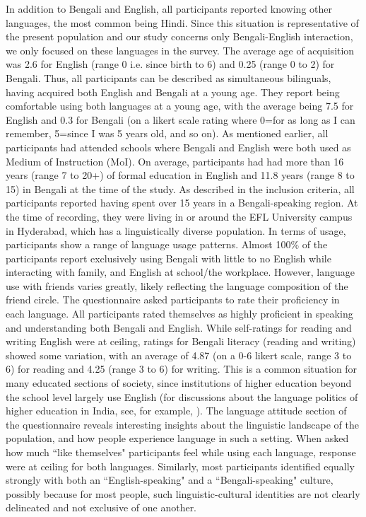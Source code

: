 \documentclass[12 pt]{article}
\begin{document}
In addition to Bengali and English, all participants reported knowing other languages, the most common being Hindi. Since this situation is representative of the present population and our study concerns only Bengali-English interaction, we only focused on these languages in the survey.
The average age of acquisition was 2.6 for English (range 0 i.e. since birth to 6) and 0.25 (range 0 to 2) for Bengali. Thus, all participants can be described as simultaneous bilinguals, having acquired both English and Bengali at a young age. They report being comfortable using both languages at a young age, with the average being 7.5 for English and 0.3 for Bengali (on a likert scale rating where 0=for as long as I can remember, 5=since I was 5 years old, and so on). As mentioned earlier, all participants had attended schools where Bengali and English were both used as Medium of Instruction (MoI). On average, participants had had more than 16 years (range 7 to 20+) of formal education in English and 11.8 years (range 8 to 15) in Bengali at the time of the study. As described in the inclusion criteria, all participants reported having spent over 15 years in a Bengali-speaking region. At the time of recording, they were living in or around the EFL University campus in Hyderabad, which has a linguistically diverse population. In terms of usage, participants show a range of language usage patterns. Almost 100\% of the participants report exclusively using Bengali with little to no English while interacting with family, and English at school/the workplace. However, language use with friends varies greatly, likely reflecting the language composition of the friend circle. 
The questionnaire asked participants to rate their proficiency in each language. All participants rated themselves as highly proficient in speaking and understanding both Bengali and English. While self-ratings for reading and writing English were at ceiling, ratings for Bengali literacy (reading and writing) showed some variation, with an average of 4.87 (on a 0-6 likert scale, range 3 to 6) for reading and 4.25 (range 3 to 6) for writing. This is a common situation for many educated sections of society, since institutions of higher education beyond the school level largely use English (for discussions about the language politics of higher education in India, see, for example, \cite{mohanty2009multilingual}). 
The language attitude section of the questionnaire reveals interesting insights about the linguistic landscape of the population, and how people experience language in such a setting. When asked how much ``like themselves" participants feel while using each language, response were at ceiling for both languages. Similarly, most participants identified equally strongly with both an ``English-speaking" and a ``Bengali-speaking" culture, possibly because for most people, such linguistic-cultural identities are not clearly delineated and not exclusive of one another. 
\end{document}
